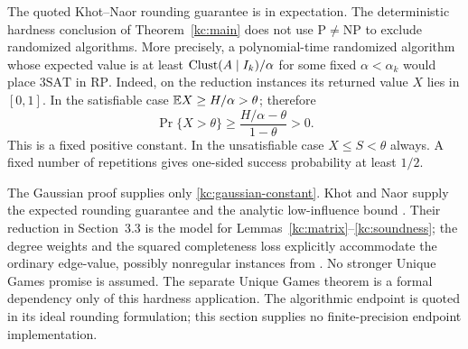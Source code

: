 \begin{remark}\label{kc:randomized}
The quoted Khot--Naor rounding guarantee is in expectation.
The deterministic hardness conclusion of Theorem~\ref{kc:main} does
not use \(\mathrm P\ne\mathrm{NP}\) to exclude randomized
algorithms. More precisely, a polynomial-time randomized algorithm
whose expected value is at least \(\operatorname{Clust}(A\mid I_k)/\alpha\)
for some fixed \(\alpha<\alpha_k\) would place
\(\mathrm{3SAT}\) in \(\mathrm{RP}\).
Indeed, on the reduction instances its returned value \(X\) lies
in \([0,1]\). In the satisfiable case \(\mathbb E X\ge H/\alpha>\theta\);
therefore
\[
 \Pr\{X>\theta\}\ge
 \frac{H/\alpha-\theta}{1-\theta}>0.
\]
This is a fixed positive constant. In the unsatisfiable case
\(X\le S<\theta\) always. A fixed number of repetitions gives
one-sided success probability at least \(1/2\).
\end{remark}

\begin{remark}\label{kc:dependencies}
The Gaussian proof supplies only \eqref{kc:gaussian-constant}.
Khot and Naor supply the expected rounding guarantee
\cite[Theorem~2.1]{KhotNaor} and the analytic
low-influence bound \cite[Theorem~3.8]{KhotNaor}.
Their reduction in Section~3.3 is the model for
Lemmas~\ref{kc:matrix}--\ref{kc:soundness}; the degree weights and
the squared completeness loss explicitly accommodate the ordinary
edge-value, possibly nonregular instances from
\cite[Theorem~1.1]{UniqueGamesTheorem}.
No stronger Unique Games promise is assumed.
The separate Unique Games theorem is a formal dependency only
of this hardness application. The algorithmic endpoint is quoted
in its ideal rounding formulation; this section supplies no
finite-precision endpoint implementation.
\end{remark}

